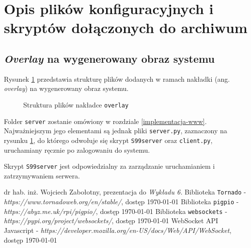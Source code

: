 \documentclass{article}
\begin{document}
\section{Opis plików konfiguracyjnych i skryptów dołączonych do archiwum}

\subsection{\textit{Overlay} na wygenerowany obraz systemu}

Rysunek \ref{fig:tree-overlay} przedstawia strukturę plików dodanych w ramach nakładki (ang. \textit{overlay}) na wygenerowany obraz systemu.

\begin{figure}[H]
    \caption{Struktura plików nakładce \texttt{overlay}}
    \label{fig:tree-overlay}
\end{figure}

Folder \texttt{server} zostanie omówiony w rozdziale \ref{implementacja-www}. Najważniejszym jego elementami są jednak pliki \texttt{server.py}, zaznaczony na rysunku \ref{fig:tree-overlay}, do którego odwołuje się skrypt \texttt{S99server} oraz \texttt{client.py}, uruchamiany ręcznie po zalogowaniu do systemu. 

Skrypt \texttt{S99server} jest odpowiedzialny za zarządzanie uruchamianiem i zatrzymywaniem serwera.


\begin{thebibliography}{9}
 dr hab. inż. Wojciech Zabołotny, prezentacja do \textit{Wykładu 6.}
 Biblioteka \texttt{Tornado} - \textit{https://www.tornadoweb.org/en/stable/}, dostęp \today
{} Biblioteka \texttt{pigpio} - \textit{https://abyz.me.uk/rpi/pigpio/}, dostęp \today
{} Biblioteka \texttt{websockets} - \textit{https://pypi.org/project/websockets/}, dostęp \today
{} WebSocket API Javascript - \textit{https://developer.mozilla.org/en-US/docs/Web/API/WebSocket}, dostęp \today
\end{thebibliography}
\end{document}
